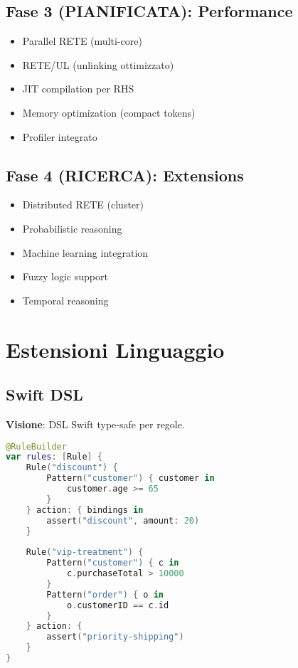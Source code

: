 \subsection{Fase 3 (PIANIFICATA): Performance}

\begin{itemize}
\item Parallel RETE (multi-core)
\item RETE/UL (unlinking ottimizzato)
\item JIT compilation per RHS
\item Memory optimization (compact tokens)
\item Profiler integrato
\end{itemize}

\subsection{Fase 4 (RICERCA): Extensions}

\begin{itemize}
\item Distributed RETE (cluster)
\item Probabilistic reasoning
\item Machine learning integration
\item Fuzzy logic support
\item Temporal reasoning
\end{itemize}

\section{Estensioni Linguaggio}

\subsection{Swift DSL}

\textbf{Visione}: DSL Swift type-safe per regole.

\begin{lstlisting}[language=Swift]
@RuleBuilder
var rules: [Rule] {
    Rule("discount") {
        Pattern("customer") { customer in
            customer.age >= 65
        }
    } action: { bindings in
        assert("discount", amount: 20)
    }
    
    Rule("vip-treatment") {
        Pattern("customer") { c in
            c.purchaseTotal > 10000
        }
        Pattern("order") { o in
            o.customerID == c.id
        }
    } action: {
        assert("priority-shipping")
    }
}
\end{lstlisting}

